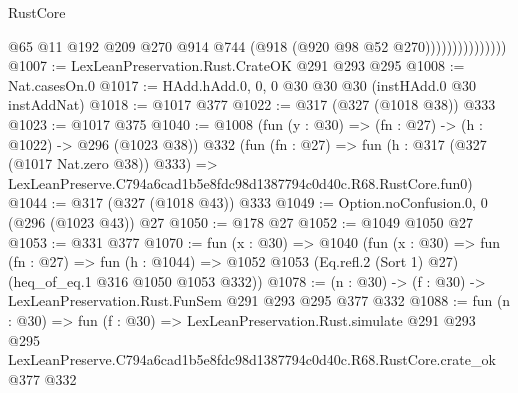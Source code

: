 \begin{lexlean}{RustCore}
\begin{coremodule}
                              @65
                              @11
                              @192
                              @209
                              @270
                              @914
                              @744
                              (@918 (@920 @98 @52 @270)))))))))))))))
@1007 := LexLeanPreservation.Rust.CrateOK @291 @293 @295
@1008 := Nat.casesOn.{0}
@1017 := HAdd.hAdd.{0, 0, 0} @30 @30 @30 (instHAdd.{0} @30 instAddNat)
@1018 := @1017 @377
@1022 := @317 (@327 (@1018 @38)) @333
@1023 := @1017 @375
@1040 := @1008
    (fun (y : @30) => (fn : @27) -> (h : @1022) -> @296 (@1023 @38))
    @332
    (fun (fn : @27) =>
    fun (h : @317 (@327 (@1017 Nat.zero @38)) @333) =>
    LexLeanPreserve.C794a6cad1b5e8fdc98d1387794c0d40c.R68.RustCore.fun0)
@1044 := @317 (@327 (@1018 @43)) @333
@1049 := Option.noConfusion.{0, 0} (@296 (@1023 @43)) @27
@1050 := @178 @27
@1052 := @1049 @1050 @27
@1053 := @331 @377
@1070 := fun (x : @30) =>
  @1040
    (fun (x : @30) =>
    fun (fn : @27) =>
    fun (h : @1044) => @1052 @1053 (Eq.refl.{2} (Sort 1) @27) (heq_of_eq.{1} @316 @1050 @1053 @332))
@1078 := (n : @30) -> (f : @30) -> LexLeanPreservation.Rust.FunSem @291 @293 @295 @377 @332
@1088 := fun (n : @30) =>
  fun (f : @30) =>
  LexLeanPreservation.Rust.simulate
    @291
    @293
    @295
    LexLeanPreserve.C794a6cad1b5e8fdc98d1387794c0d40c.R68.RustCore.crate_ok
    @377
    @332
\end{coremodule}
\end{lexlean}
